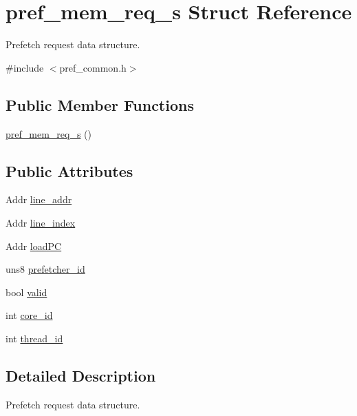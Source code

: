 \hypertarget{structpref__mem__req__s}{
\section{pref\_\-mem\_\-req\_\-s Struct Reference}
\label{structpref__mem__req__s}
}


Prefetch request data structure.  




{\ttfamily \#include $<$pref\_\-common.h$>$}

\subsection*{Public Member Functions}
\begin{DoxyCompactItemize}
\item 
\hyperlink{structpref__mem__req__s_a53a42754295d566d82d397585d23595b}{pref\_\-mem\_\-req\_\-s} ()
\end{DoxyCompactItemize}
\subsection*{Public Attributes}
\begin{DoxyCompactItemize}
\item 
Addr \hyperlink{structpref__mem__req__s_aa08c0000b0533eac7fbb75054399e236}{line\_\-addr}
\item 
Addr \hyperlink{structpref__mem__req__s_ad208a512a0ad9d988fdf5be679c3fb46}{line\_\-index}
\item 
Addr \hyperlink{structpref__mem__req__s_acfd65621ea0aeda3d983556b62469367}{loadPC}
\item 
uns8 \hyperlink{structpref__mem__req__s_a56208adb8dd71d2a86279e86994622cd}{prefetcher\_\-id}
\item 
bool \hyperlink{structpref__mem__req__s_a53ee77671e3af46272c4207f8bcce143}{valid}
\item 
int \hyperlink{structpref__mem__req__s_adfb942d07929f0399b15867437d1c481}{core\_\-id}
\item 
int \hyperlink{structpref__mem__req__s_aab6cdec9cc8bb0c7df38876c9680d01a}{thread\_\-id}
\end{DoxyCompactItemize}


\subsection{Detailed Description}
Prefetch request data structure. 

